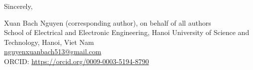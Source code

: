\documentclass[11pt,a4paper]{article}
\begin{document}
Sincerely,

\vspace{1.5\baselineskip}
Xuan Bach Nguyen (corresponding author), on behalf of all authors\\
School of Electrical and Electronic Engineering, Hanoi University of Science and Technology, Hanoi, Viet Nam\\
\href{mailto:nguyenxuanbach513@gmail.com}{nguyenxuanbach513@gmail.com}\\
ORCID: \url{https://orcid.org/0009-0003-5194-8790}
\end{document}
